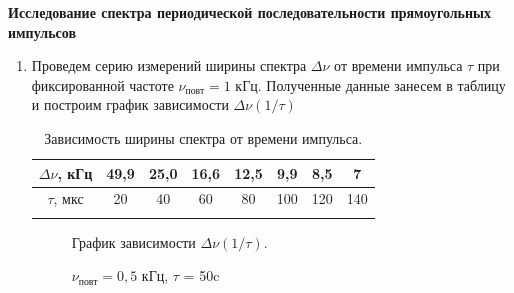 \documentclass[a4paper, 12pt]{article}%
\begin{document}
	\textbf{Исследование спектра периодической последовательности
		прямоугольных импульсов}
	\begin{enumerate}
	
	\item Проведем серию измерений ширины спектра $\Delta\nu$ от времени импульса $\tau$ при фиксированной частоте $\nu_{\text{повт}} = 1 $ кГц. Полученные данные занесем в таблицу и построим график зависимости $\Delta\nu(1/\tau)$
	

\begin{longtable} {|c|c|c|c|c|c|c|c|}
 	\hline
 	$\Delta\nu$, кГц& 49,9 & 25,0 & 16,6 & 12,5 & 9,9 & 8,5 & 7  \\ \hline
 	$\tau$, мкс & 20 & 40 & 60 & 80 & 100 & 120 & 140 \\ \hline
 	\caption{Зависимость ширины спектра от времени импульса.}
\end{longtable}


	
\begin{figure}[H]
	\caption{График зависимости $\Delta\nu(1/\tau)$.}
\end{figure}
	
	
\newpage

\begin{figure}[H]
	\caption{$\nu_{\text{повт}} = 0,5$ кГц, $\tau$ = 50c}
\end{figure}
	

\end{enumerate}
\end{document}

